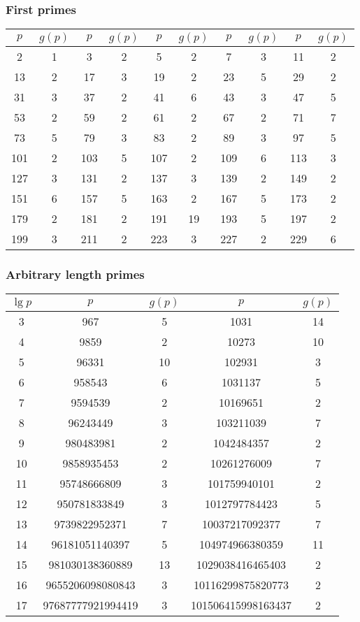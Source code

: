 
\subsubsection{First primes}
  \begin{tabular}{|c|c|c|c|c|c|c|c|c|c|}
  \hline
  $p$ & $g(p)$ & $p$ & $g(p)$ & $p$ & $g(p)$ & $p$ & $g(p)$ & $p$ & $g(p)$ \\      
  \hline
2 & 1 & 3 & 2 & 5 & 2 & 7 & 3 & 11 & 2 \\
13 & 2 & 17 & 3 & 19 & 2 & 23 & 5 & 29 & 2 \\
31 & 3 & 37 & 2 & 41 & 6 & 43 & 3 & 47 & 5 \\
53 & 2 & 59 & 2 & 61 & 2 & 67 & 2 & 71 & 7 \\
73 & 5 & 79 & 3 & 83 & 2 & 89 & 3 & 97 & 5 \\
101 & 2 & 103 & 5 & 107 & 2 & 109 & 6 & 113 & 3 \\
127 & 3 & 131 & 2 & 137 & 3 & 139 & 2 & 149 & 2 \\
151 & 6 & 157 & 5 & 163 & 2 & 167 & 5 & 173 & 2 \\
179 & 2 & 181 & 2 & 191 & 19 & 193 & 5 & 197 & 2 \\
199 & 3 & 211 & 2 & 223 & 3 & 227 & 2 & 229 & 6 \\
  \hline
  \end{tabular}

\subsubsection{Arbitrary length primes}
  \begin{tabular}{|c|c|c|c|c|}
  \hline
  $\lg p$ & $p$ & $g(p)$ & $p$ & $g(p)$ \\ \hline
3 & 967 & 5 & 1031 & 14 \\
4 & 9859 & 2 & 10273 & 10 \\
5 & 96331 & 10 & 102931 & 3 \\
6 & 958543 & 6 & 1031137 & 5 \\
7 & 9594539 & 2 & 10169651 & 2 \\
8 & 96243449 & 3 & 103211039 & 7 \\
9 & 980483981 & 2 & 1042484357 & 2 \\
10 & 9858935453 & 2 & 10261276009 & 7 \\
11 & 95748666809 & 3 & 101759940101 & 2 \\
12 & 950781833849 & 3 & 1012797784423 & 5 \\
13 & 9739822952371 & 7 & 10037217092377 & 7 \\
14 & 96181051140397 & 5 & 104974966380359 & 11 \\
15 & 981030138360889 & 13 & 1029038416465403 & 2 \\
16 & 9655206098080843 & 3 & 10116299875820773 & 2 \\
17 & 97687777921994419 & 3 & 101506415998163437 & 2 \\
  \hline
  \end{tabular}

